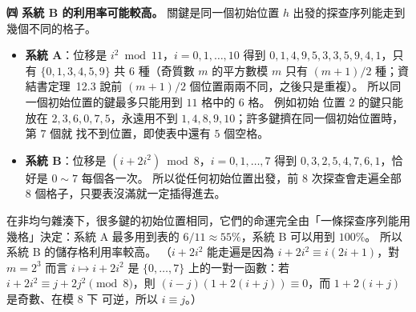 \begin{pastsoln}
\textbf{㈣ 系統 B 的利用率可能較高。} 關鍵是同一個初始位置 $h$ 出發的探查序列能走到幾個不同的格子。
\begin{itemize}
\item \textbf{系統 A}：位移是 $i^2 \bmod 11$，$i = 0, 1, \ldots, 10$ 得到 $0, 1, 4, 9, 5, 3, 3, 5, 9, 4, 1$，只有
$\{0, 1, 3, 4, 5, 9\}$ 共 $6$ 種（奇質數 $m$ 的平方數模 $m$ 只有 $(m + 1)/2$ 種；資結書定理~12.3 說前
$(m+1)/2$ 個位置兩兩不同，之後只是重複）。 所以同一個初始位置的鍵最多只能用到 $11$ 格中的 $6$ 格。 例如初始
位置 $2$ 的鍵只能放在 $2, 3, 6, 0, 7, 5$，永遠用不到 $1, 4, 8, 9, 10$；許多鍵擠在同一個初始位置時，第 $7$ 個就
找不到位置，即使表中還有 $5$ 個空格。
\item \textbf{系統 B}：位移是 $(i + 2i^2) \bmod 8$，$i = 0, 1, \ldots, 7$ 得到 $0, 3, 2, 5, 4, 7, 6, 1$，恰好是
$0 \sim 7$ 每個各一次。 所以從任何初始位置出發，前 $8$ 次探查會走遍全部 $8$ 個格子，只要表沒滿就一定插得進去。
\end{itemize}
在非均勻雜湊下，很多鍵的初始位置相同，它們的命運完全由「一條探查序列能用幾格」決定：系統 A 最多用到表的
$6/11 \approx 55\%$，系統 B 可以用到 $100\%$。 所以系統 B 的儲存格利用率較高。 （$i + 2i^2$ 能走遍是因為
$i + 2i^2 \equiv i(2i + 1)$，對 $m = 2^3$ 而言 $i \mapsto i + 2i^2$ 是 $\{0, \ldots, 7\}$ 上的一對一函數：若
$i + 2i^2 \equiv j + 2j^2 \pmod 8$，則 $(i - j)(1 + 2(i + j)) \equiv 0$，而 $1 + 2(i + j)$ 是奇數、在模 $8$ 下
可逆，所以 $i \equiv j$。）
\end{pastsoln}
